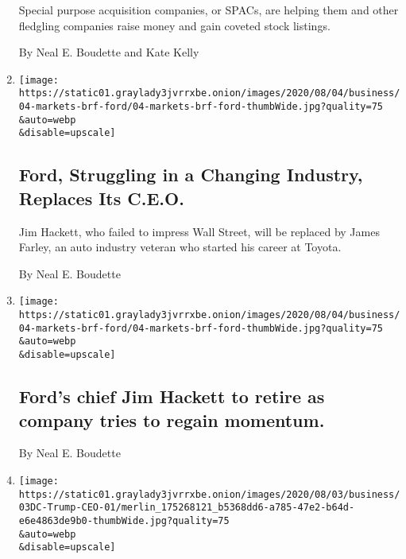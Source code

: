 \begin{enumerate}
  Special purpose acquisition companies, or SPACs, are helping them and
  other fledgling companies raise money and gain coveted stock listings.

  By Neal E. Boudette and Kate Kelly
\item
  \href{/2020/08/04/business/ford-jim-hackett-james-farley.html}{}

  \texttt{[image: https://static01.graylady3jvrrxbe.onion/images/2020/08/04/business/04-markets-brf-ford/04-markets-brf-ford-thumbWide.jpg?quality=75\\\&auto=webp\\\&disable=upscale]}

  \hypertarget{ford-struggling-in-a-changing-industry-replaces-its-ceo}{%
  \subsection{Ford, Struggling in a Changing Industry, Replaces Its
  C.E.O.}\label{ford-struggling-in-a-changing-industry-replaces-its-ceo}}

  Jim Hackett, who failed to impress Wall Street, will be replaced by
  James Farley, an auto industry veteran who started his career at
  Toyota.

  By Neal E. Boudette
\item
  \href{/2020/08/04/business/fords-chief-jim-hackett-to-retire-as-company-tries-to-regain-momentum.html}{}

  \texttt{[image: https://static01.graylady3jvrrxbe.onion/images/2020/08/04/business/04-markets-brf-ford/04-markets-brf-ford-thumbWide.jpg?quality=75\\\&auto=webp\\\&disable=upscale]}

  \hypertarget{fords-chief-jim-hackett-to-retire-as-company-tries-to-regain-momentum}{%
  \subsection{Ford's chief Jim Hackett to retire as company tries to
  regain
  momentum.}\label{fords-chief-jim-hackett-to-retire-as-company-tries-to-regain-momentum}}

  By Neal E. Boudette
\item
  \href{/2020/08/03/business/economy/trump-tiktok-china-business.html}{}

  \texttt{[image: https://static01.graylady3jvrrxbe.onion/images/2020/08/03/business/03DC-Trump-CEO-01/merlin\_175268121\_b5368dd6-a785-47e2-b64d-e6e4863de9b0-thumbWide.jpg?quality=75\\\&auto=webp\\\&disable=upscale]}

  \hypertarget{tiktok-trump-and-an-impulse-to-act-as-ceo-to-corporate-america}{%
}
\end{enumerate}
